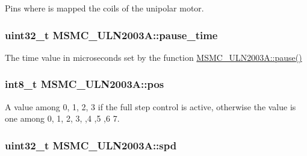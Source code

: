 Pins where is mapped the coils of the unipolar motor. 

\hypertarget{class_m_s_m_c___u_l_n2003_a_a06987cfacad47f56ec9f3e54cc72ff08}{
\subsubsection[{pause\+\_\+time}]{\setlength{\rightskip}{0pt plus 5cm}uint32\+\_\+t M\+S\+M\+C\+\_\+\+U\+L\+N2003\+A\+::pause\+\_\+time\hspace{0.3cm}{\ttfamily [private]}}}\label{class_m_s_m_c___u_l_n2003_a_a06987cfacad47f56ec9f3e54cc72ff08}


The time value in microseconds set by the function \hyperlink{class_m_s_m_c___u_l_n2003_a_aa1d3444465d59ca6c87f05f565dde4a2}{M\+S\+M\+C\+\_\+\+U\+L\+N2003\+A\+::pause()} 

\hypertarget{class_m_s_m_c___u_l_n2003_a_a8318f5fbce84ff22c9d800e6b637bf52}{
\subsubsection[{pos}]{\setlength{\rightskip}{0pt plus 5cm}int8\+\_\+t M\+S\+M\+C\+\_\+\+U\+L\+N2003\+A\+::pos\hspace{0.3cm}{\ttfamily [private]}}}\label{class_m_s_m_c___u_l_n2003_a_a8318f5fbce84ff22c9d800e6b637bf52}


A value among 0, 1, 2, 3 if the full step control is active, otherwise the value is one among 0, 1, 2, 3, ,4 ,5 ,6 7. 

\hypertarget{class_m_s_m_c___u_l_n2003_a_ab5cb8c78446fe371662f6ce6d2b289d5}{
\subsubsection[{spd}]{\setlength{\rightskip}{0pt plus 5cm}uint32\+\_\+t M\+S\+M\+C\+\_\+\+U\+L\+N2003\+A\+::spd\hspace{0.3cm}{\ttfamily [private]}}}\label{class_m_s_m_c___u_l_n2003_a_ab5cb8c78446fe371662f6ce6d2b289d5}


